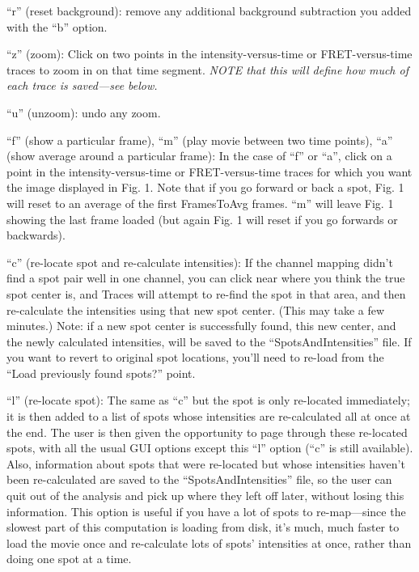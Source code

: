 \documentclass[11pt]{article}
\begin{document}
``r'' (reset background): remove any additional background subtraction you added with the ``b'' option.

``z'' (zoom): Click on two points in the intensity-versus-time or FRET-versus-time traces to zoom in on that time segment. {\it NOTE that this will define how much of each trace is saved---see below.}

``u'' (unzoom): undo any zoom. 

``f'' (show a particular frame), ``m'' (play movie between two time points), ``a'' (show average around a particular frame): In the case of ``f'' or ``a'', click on a point in the intensity-versus-time or FRET-versus-time traces for which you want the image displayed in Fig. 1.  Note that if you go forward or back a spot, Fig. 1 will reset to an average of the first FramesToAvg frames.  ``m'' will leave Fig. 1 showing the last frame loaded (but again Fig. 1 will reset if you go forwards or backwards).

``c'' (re-locate spot and re-calculate intensities): If the channel mapping didn't find a spot pair well in one channel, you can click near where you think the true spot center is, and Traces will attempt to re-find the spot in that area, and then re-calculate the intensities using that new spot center. (This may take a few minutes.)  Note: if a new spot center is successfully found, this new center, and the newly calculated intensities, will be saved to the ``SpotsAndIntensities'' file.  If you want to revert to original spot locations, you'll need to re-load from the ``Load previously found spots?'' point. 

``l'' (re-locate spot): The same as ``c'' but the spot is only re-located immediately; it is then added to a list of spots whose intensities are re-calculated all at once at the end.  The user is then given the opportunity to page through these re-located spots, with all the usual GUI options except this ``l'' option (``c'' is still available).  Also, information about spots that were re-located but whose intensities haven't been re-calculated are saved to the ``SpotsAndIntensities'' file, so the user can quit out of the analysis and pick up where they left off later, without losing this information.  This option is useful if you have a lot of spots to re-map---since the slowest part of this computation is loading from disk, it's much, much faster to load the movie once and re-calculate lots of spots' intensities at once, rather than doing one spot at a time.\\
\end{document}
